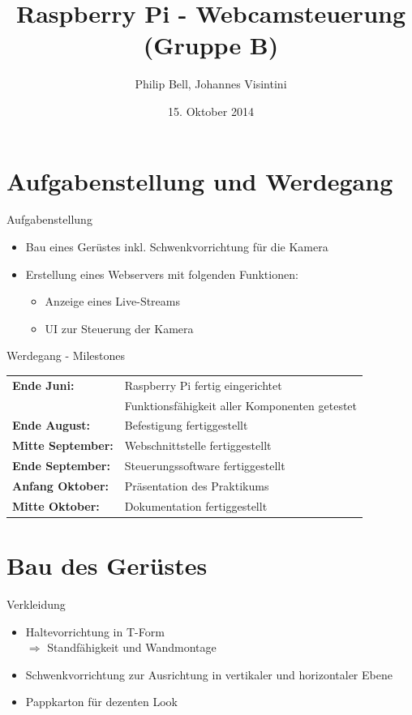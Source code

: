 \documentclass{beamer}
\title{Raspberry Pi - Webcamsteuerung (Gruppe B)}
\author{Philip Bell, Johannes Visintini}
\date{15. Oktober 2014}
\begin{document}
\begin{frame}[plain]
\titlepage
\end{frame}

\begin{frame} %
\tableofcontents
\end{frame}

\section{Aufgabenstellung und Werdegang}
\begin{frame}{Aufgabenstellung}
\begin{itemize}
	\item Bau eines Gerüstes inkl. Schwenkvorrichtung für die Kamera
	\item Erstellung eines Webservers mit folgenden Funktionen:
	\begin{itemize}
		\item Anzeige eines Live-Streams
		\item UI zur Steuerung der Kamera
	\end{itemize}
\end{itemize}
\end{frame}

\begin{frame}{Werdegang - Milestones}
\begin{tabular}{l l}
	\textbf{Ende Juni:}			& Raspberry Pi fertig eingerichtet\\
								& Funktionsfähigkeit aller Komponenten getestet\\
	\textbf{Ende August:}			& Befestigung fertiggestellt\\
	\textbf{Mitte September:}		& Webschnittstelle fertiggestellt\\
	\textbf{Ende September:}		& Steuerungssoftware fertiggestellt\\
	\textbf{Anfang Oktober:}	& Präsentation des Praktikums\\
	\textbf{Mitte Oktober:}		& Dokumentation fertiggestellt
\end{tabular}
\end{frame}

\section{Bau des Gerüstes}%
\begin{frame}{Verkleidung}
\begin{itemize}
	\item<1-> Haltevorrichtung in T-Form\\ $\Rightarrow$ Standfähigkeit und Wandmontage
	\item<2-> Schwenkvorrichtung zur Ausrichtung in vertikaler und horizontaler Ebene
	\item<3-> Pappkarton für dezenten Look
\end{itemize}
\end{frame}
\end{document}
